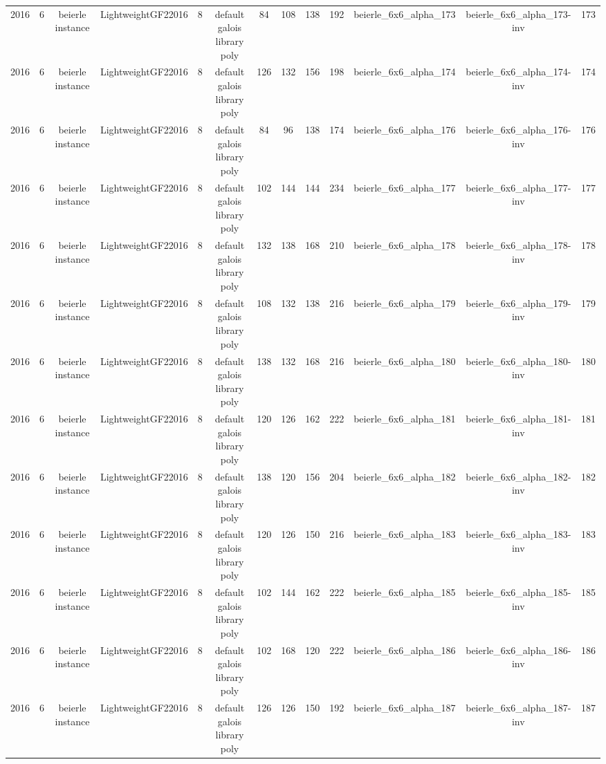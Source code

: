 \begin{tabular}{c c c c c c c c c c c c c}
2016 & 6 & beierle instance & LightweightGF22016 & 8 & default galois library poly & 84 & 108 & 138 & 192 & beierle_6x6_alpha_173 & beierle_6x6_alpha_173-inv & 173 \\
2016 & 6 & beierle instance & LightweightGF22016 & 8 & default galois library poly & 126 & 132 & 156 & 198 & beierle_6x6_alpha_174 & beierle_6x6_alpha_174-inv & 174 \\
2016 & 6 & beierle instance & LightweightGF22016 & 8 & default galois library poly & 84 & 96 & 138 & 174 & beierle_6x6_alpha_176 & beierle_6x6_alpha_176-inv & 176 \\
2016 & 6 & beierle instance & LightweightGF22016 & 8 & default galois library poly & 102 & 144 & 144 & 234 & beierle_6x6_alpha_177 & beierle_6x6_alpha_177-inv & 177 \\
2016 & 6 & beierle instance & LightweightGF22016 & 8 & default galois library poly & 132 & 138 & 168 & 210 & beierle_6x6_alpha_178 & beierle_6x6_alpha_178-inv & 178 \\
2016 & 6 & beierle instance & LightweightGF22016 & 8 & default galois library poly & 108 & 132 & 138 & 216 & beierle_6x6_alpha_179 & beierle_6x6_alpha_179-inv & 179 \\
2016 & 6 & beierle instance & LightweightGF22016 & 8 & default galois library poly & 138 & 132 & 168 & 216 & beierle_6x6_alpha_180 & beierle_6x6_alpha_180-inv & 180 \\
2016 & 6 & beierle instance & LightweightGF22016 & 8 & default galois library poly & 120 & 126 & 162 & 222 & beierle_6x6_alpha_181 & beierle_6x6_alpha_181-inv & 181 \\
2016 & 6 & beierle instance & LightweightGF22016 & 8 & default galois library poly & 138 & 120 & 156 & 204 & beierle_6x6_alpha_182 & beierle_6x6_alpha_182-inv & 182 \\
2016 & 6 & beierle instance & LightweightGF22016 & 8 & default galois library poly & 120 & 126 & 150 & 216 & beierle_6x6_alpha_183 & beierle_6x6_alpha_183-inv & 183 \\
2016 & 6 & beierle instance & LightweightGF22016 & 8 & default galois library poly & 102 & 144 & 162 & 222 & beierle_6x6_alpha_185 & beierle_6x6_alpha_185-inv & 185 \\
2016 & 6 & beierle instance & LightweightGF22016 & 8 & default galois library poly & 102 & 168 & 120 & 222 & beierle_6x6_alpha_186 & beierle_6x6_alpha_186-inv & 186 \\
2016 & 6 & beierle instance & LightweightGF22016 & 8 & default galois library poly & 126 & 126 & 150 & 192 & beierle_6x6_alpha_187 & beierle_6x6_alpha_187-inv & 187 \\

\end{tabular}
